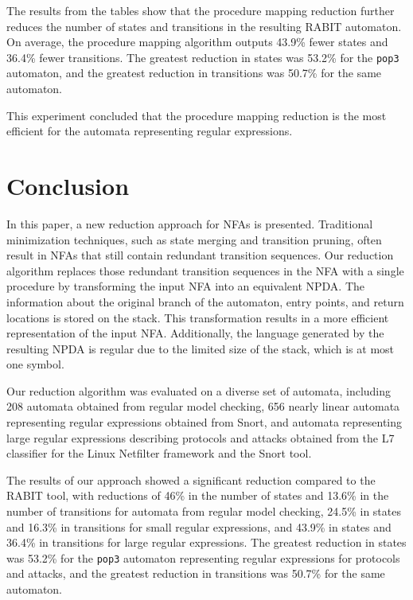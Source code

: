         The results from the tables show that the procedure mapping reduction further reduces the number of states and transitions in the resulting RABIT automaton. On average, the procedure mapping algorithm outputs 43.9\% fewer states and 36.4\% fewer transitions. The greatest reduction in states was 53.2\% for the \texttt{pop3} automaton, and the greatest reduction in transitions was 50.7\% for the same automaton.

        This experiment concluded that the procedure mapping reduction is the most efficient for the automata representing regular expressions.

\section{Conclusion}
    In this paper, a new reduction approach for NFAs is presented. Traditional minimization techniques, such as state merging and transition pruning, often result in NFAs that still contain redundant transition sequences. Our reduction algorithm replaces those redundant transition sequences in the NFA with a single procedure by transforming the input NFA into an equivalent NPDA. The information about the original branch of the automaton, entry points, and return locations is stored on the stack. This transformation results in a more efficient representation of the input NFA. Additionally, the language generated by the resulting NPDA is regular due to the limited size of the stack, which is at most one symbol.

    Our reduction algorithm was evaluated on a diverse set of automata, including 208 automata obtained from regular model checking, 656 nearly linear automata representing regular expressions obtained from Snort, and automata representing large regular expressions describing protocols and attacks obtained from the L7 classifier for the Linux Netfilter framework and the Snort tool.

    The results of our approach showed a significant reduction compared to the RABIT tool, with reductions of 46\% in the number of states and 13.6\% in the number of transitions for automata from regular model checking, 24.5\% in states and 16.3\% in transitions for small regular expressions, and 43.9\% in states and 36.4\% in transitions for large regular expressions. The greatest reduction in states was 53.2\% for the \texttt{pop3} automaton representing regular expressions for protocols and attacks, and the greatest reduction in transitions was 50.7\% for the same automaton.

